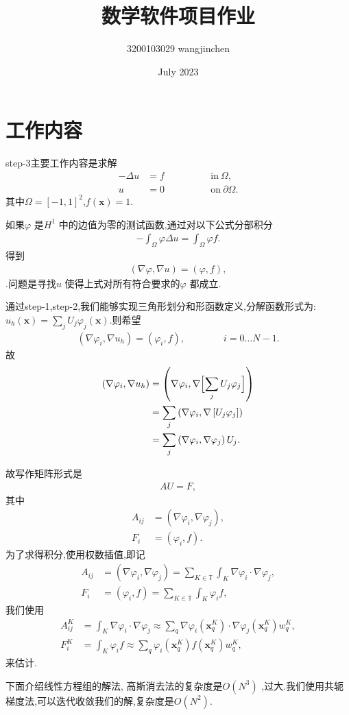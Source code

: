 \documentclass[UTF8]{ctexart}
\title{数学软件项目作业}
\author{3200103029 wangjinchen}
\date{July 2023}
\begin{document}
\maketitle
\section{工作内容}
step-3主要工作内容是求解
\begin{align*}
  -\Delta u &= f \qquad\qquad & \text{in}\ \Omega,
  \\
  u &= 0 \qquad\qquad & \text{on}\ \partial\Omega.
\end{align*}
其中$\Omega=[-1,1]^2$,$f(\mathbf x)=1$.\par
如果$\varphi$ 是$H^1$ 中的边值为零的测试函数,通过对以下公式分部积分
\begin{align*}
  -\int_\Omega \varphi \Delta u = \int_\Omega \varphi f.
\end{align*}
得到\begin{align*}
  (\nabla\varphi, \nabla u)
   = (\varphi, f),
\end{align*}
.问题是寻找$u$ 使得上式对所有符合要求的$\varphi$ 都成立.\par
通过step-1,step-2,我们能够实现三角形划分和形函数定义,分解函数形式为:$u_h(\mathbf x)=\sum_j U_j \varphi_j(\mathbf
x)$.则希望\begin{align*}
  (\nabla\varphi_i, \nabla u_h)
   = (\varphi_i, f),
   \qquad\qquad
   i=0\ldots N-1.
\end{align*}
故
\begin{align*}
  (\nabla\varphi_i, \nabla u_h)
  &= \left(\nabla\varphi_i, \nabla \Bigl[\sum_j U_j \varphi_j\Bigr]\right)
\\
  &= \sum_j \left(\nabla\varphi_i, \nabla \left[U_j \varphi_j\right]\right)
\\
  &= \sum_j \left(\nabla\varphi_i, \nabla \varphi_j \right) U_j.
\end{align*}

故写作矩阵形式是\begin{align*}
  A U = F,
\end{align*}
其中\begin{align*}
  A_{ij} &= (\nabla\varphi_i, \nabla \varphi_j),
  \\
  F_i &= (\varphi_i, f).
\end{align*}
为了求得积分,使用权数插值,即记\begin{align*}
    A_{ij} &= (\nabla\varphi_i, \nabla \varphi_j)
    = \sum_{K \in {\mathbb T}} \int_K \nabla\varphi_i \cdot \nabla \varphi_j,
    \\
    F_i &= (\varphi_i, f)
    = \sum_{K \in {\mathbb T}} \int_K \varphi_i f,
  \end{align*}
  我们使用\begin{align*}
    A^K_{ij} &=
    \int_K \nabla\varphi_i \cdot \nabla \varphi_j
    \approx
    \sum_q \nabla\varphi_i(\mathbf x^K_q) \cdot \nabla
    \varphi_j(\mathbf x^K_q) w_q^K,
    \\
    F^K_i &=
    \int_K \varphi_i f
    \approx
    \sum_q \varphi_i(\mathbf x^K_q) f(\mathbf x^K_q) w^K_q,
  \end{align*}
  来估计.\par
  下面介绍线性方程组的解法,
高斯消去法的复杂度是$O(N^3) $ ,过大.我们使用共轭梯度法,可以迭代收敛我们的解,复杂度是$O(N^2)$.\newpage
\end{document}
